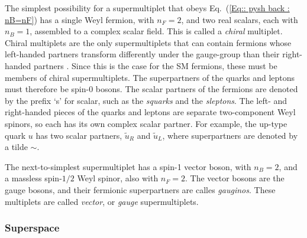 \documentclass[twoside,english]{uiofysmaster}
\begin{document}
The simplest possibility for a supermultiplet that obeys Eq.~(\ref{Eq:: pysh back : nB=nF}) has a single Weyl fermion, with $n_F =2$, and two real scalars, each with $n_B=1$, assembled to a complex scalar field. This is called a \textit{chiral} multiplet. Chiral multiplets are the only supermultiplets that can contain fermions whose left-handed partners transform differently under the gauge-group than their right-handed partners \cite{martin2010supersymmetry}. Since this is the case for the SM fermions, these must be members of chiral supermultiplets. The superpartners of the quarks and leptons must therefore be spin-0 bosons. The scalar partners of the fermions are denoted by the prefix `s' for scalar, such as the \textit{squarks} and the \textit{sleptons}. The left- and right-handed pieces of the quarks and leptons are separate two-component Weyl spinors, so each has its own complex scalar partner. For example, the up-type quark $u$ has two scalar partners, $\widetilde{u}_R$ and $\widetilde{u}_L$, where superpartners are denoted by a tilde $\sim$. 

The next-to-simplest supermultiplet has a spin-1 vector boson, with $n_B=2$, and a massless spin-$1/2$ Weyl spinor, also with $n_F=2$. The vector bosons are the gauge bosons, and their fermionic superpartners are calles \textit{gauginos}. These multiplets are called \textit{vector}, or \textit{gauge} supermultiplets. 




\subsubsection{Superspace}
\end{document}
